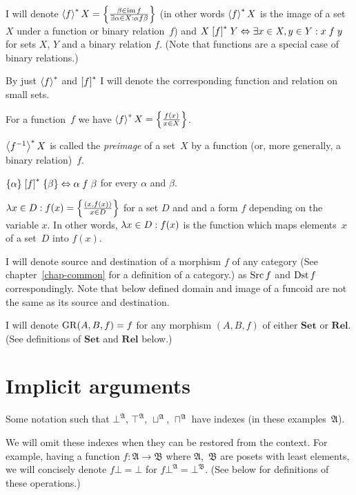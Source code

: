 I will denote $\left\langle f\right\rangle ^{\ast}X=\left\{ \frac{\beta\in\operatorname{im} f}{\exists\alpha\in X:\alpha\mathrel f\beta}\right\}$
(in other words $\left\langle f\right\rangle ^{\ast}X$ is the image of a set~$X$ under a function or binary relation~$f$)
and $X\mathrel{\left[f\right]^{\ast}}Y\Leftrightarrow\exists x\in X,y\in Y:x\mathrel{f}y$
for sets $X$, $Y$ and a binary relation $f$. (Note that functions
are a special case of binary relations.)

By just $\left\langle f\right\rangle ^{\ast}$ and $\mathrel{\left[f\right]^{\ast}}$ I will denote the corresponding
function and relation on small sets.

\begin{obvious}
For a function~$f$ we have $\left\langle f\right\rangle ^{\ast}X = \left\{ \frac{f(x)}{x\in X}\right\}$.
\end{obvious}

\begin{defn}
$\left\langle f^{-1}\right\rangle ^{\ast}X$ is called the \emph{preimage} of a set~$X$ by a function (or, more generally, a binary relation)~$f$.
\end{defn}

\begin{obvious}
$\{\alpha\}\mathrel{\left[f\right]^{\ast}}\{\beta\}\Leftrightarrow\alpha\mathrel f\beta$
for every $\alpha$ and $\beta$.
\end{obvious}
$\lambda x\in D:f(x)=\left\{ \frac{(x,f(x))}{x\in D}\right\}$ for a set $D$ and
and a form $f$ depending on the variable $x$.
In other words, $\lambda x\in D:f(x)$ is the function which maps elements~$x$ of a set~$D$ into $f(x)$.

I will denote source and destination of a morphism $f$ of any category
(See chapter~\ref{chap-common} for a definition of a category.)
as $\operatorname{Src} f$ and $\operatorname{Dst} f$ correspondingly. Note that below defined
domain and image of a funcoid are not the same as its source and destination.

I will denote $\operatorname{GR}(A,B,f)=f$ for any morphism $(A,B,f)$ of either
$\mathbf{Set}$ or $\mathbf{Rel}$. (See definitions of $\mathbf{Set}$
and $\mathbf{Rel}$ below.)

\section{Implicit arguments}

Some notation such that $\bot^\mathfrak{A}$, $\top^\mathfrak{A}$,
$\sqcup^\mathfrak{A}$, $\sqcap^\mathfrak{A}$ have indexes (in these examples~$\mathfrak{A}$).

We will omit these indexes when they can be restored from the context. For example,
having a function $f:\mathfrak{A}\rightarrow\mathfrak{B}$ where $\mathfrak{A}$,~$\mathfrak{B}$
are posets with least elements, we will concisely denote $f\bot = \bot$ for $f\bot^{\mathfrak{A}} = \bot^{\mathfrak{B}}$.
(See below for definitions of these operations.)

